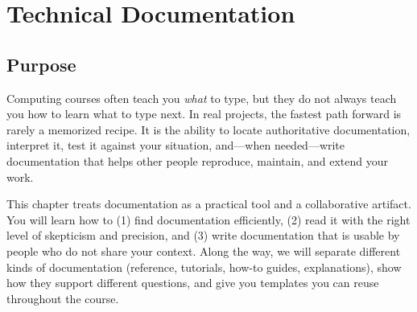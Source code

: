 %

\chapter{Technical Documentation}
\label{ch:documentation}

\section*{Purpose}
Computing courses often teach you \emph{what} to type, but they do not always teach you how to learn what to type next. In real projects, the fastest path forward is rarely a memorized recipe. It is the ability to locate authoritative documentation, interpret it, test it against your situation, and—when needed—write documentation that helps other people reproduce, maintain, and extend your work.

This chapter treats documentation as a practical tool and a collaborative artifact. You will learn how to (1) find documentation efficiently, (2) read it with the right level of skepticism and precision, and (3) write documentation that is usable by people who do not share your context. Along the way, we will separate different kinds of documentation (reference, tutorials, how-to guides, explanations), show how they support different questions, and give you templates you can reuse throughout the course.

